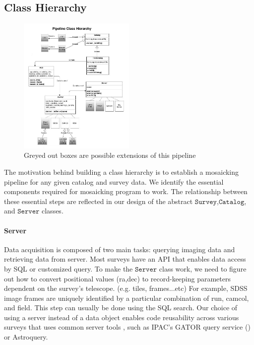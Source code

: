 \documentclass[5p]{elsarticle}
\begin{document}
	\subsection{Class Hierarchy}
	\begin{figure}[h]
		\includegraphics[width=0.5\textwidth]{pipeline}
		\caption{Greyed out boxes are possible extensions of this pipeline}
	\end{figure}
 	The motivation behind building a class hierarchy is to establish a mosaicking pipeline for any given catalog and survey data. We identify the essential components required for mosaicking program to work. The relationship between these essential steps are reflected in our design of the abstract $\texttt{Survey}$,$\texttt{Catalog}$, and $\texttt{Server}$ classes. 
 		\paragraph{Server}
		Data acquisition is composed of two main tasks: querying imaging data and retrieving data from server. Most surveys have an API that enables data access by SQL or customized query. To make the $\texttt{Server}$ class work, we need to figure out how to convert positional values (ra,dec) to record-keeping parameters dependent on the survey's telescope. (e.g. tiles, frames...etc) For example, SDSS image frames are uniquely identified by a particular combination of  run, camcol, and field.  This step can usually be done using the SQL search. Our choice of using a server instead of a data object enables code reusability across various surveys that uses common server tools , such as IPAC's GATOR query service (\citet{irsa}) or  Astroquery.
\end{document}
